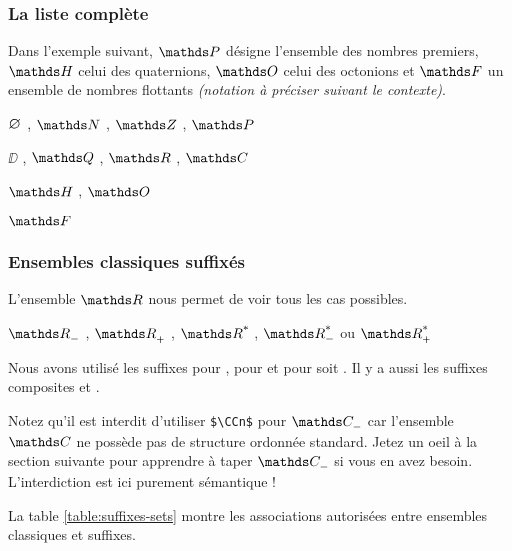 \documentclass[12pt,a4paper]{article}
\begin{document}
\subsubsection{La liste complète}

Dans l'exemple suivant,
$\PP$ désigne l'ensemble des nombres premiers,
$\HH$ celui des quaternions,
$\OO$ celui des octonions et
$\FF$ un ensemble de nombres flottants \emph{(notation à préciser suivant le contexte)}.

\begin{latexex}
$\nullset$ , $\NN$ , $\ZZ$ , $\PP$

$\DD$ , $\QQ$ , $\RR$ , $\CC$

$\HH$ , $\OO$

$\FF$
\end{latexex}




\subsubsection{Ensembles classiques suffixés}

L'ensemble $\RR$ nous permet de voir tous les cas possibles. 

\begin{latexex}
$\RRn$ ,
$\RRp$ ,
$\RRs$ ,
$\RRsn$ ou
$\RRsp$
\end{latexex}


Nous avons utilisé les suffixes  pour ,  pour  et  pour  soit . Il y a aussi les suffixes composites  et .

\medskip

Notez qu'il est interdit d'utiliser \verb+$\CCn$+ pour $\setspecial{\CC}{n}$ car l'ensemble $\CC$ ne possède pas de structure ordonnée standard. Jetez un oeil à la section suivante pour apprendre à taper $\setspecial{\CC}{n}$ si vous en avez besoin. L'interdiction est ici purement sémantique !

\medskip

\begin{remark}
	La table \ref{table:suffixes-sets}  montre les associations autorisées entre ensembles classiques et suffixes.
\end{remark}

\end{document}
